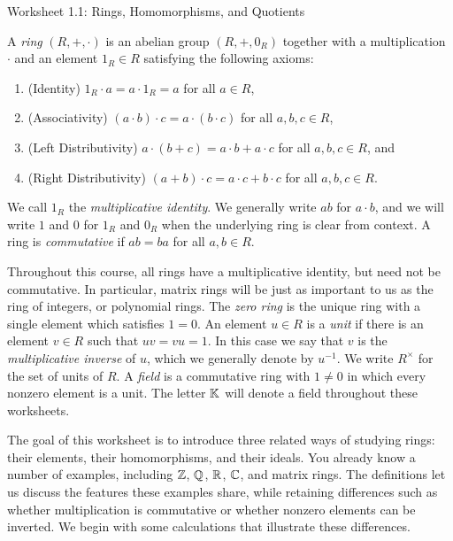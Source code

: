 \documentclass[Notebook.tex]{subfiles}
\begin{document}
\ifSubfilesClassLoaded{
    
}{}

\begin{center}
	{Worksheet 1.1: Rings, Homomorphisms, and Quotients}
\end{center}

A \emph{ring} $(R,+,\cdot)$ is an abelian group $(R,+,0_R)$ together with a multiplication $\cdot$ and an element $1_R\in R$ satisfying the following axioms:
\begin{enumerate}[label=(\roman*)]
	\item (Identity) $1_R\cdot a=a \cdot 1_R=a$ for all $a\in R$,
	\item (Associativity) $(a\cdot b)\cdot c=a\cdot(b\cdot c)$ for all $a,b,c\in R$,
	\item (Left Distributivity) $a\cdot(b+c)=a\cdot b+a \cdot c$ for all $a,b,c\in R$, and
	\item (Right Distributivity) $(a+b)\cdot c=a\cdot c+b \cdot c$ for all $a,b,c\in R$.
\end{enumerate}
We call $1_{R}$ the \emph{multiplicative identity}. We generally write $ab$ for $a\cdot b$, and we will write $1$ and $0$ for $1_R$ and $0_R$ when the underlying ring is clear from context. A ring is \emph{commutative} if $ab=ba$ for all $a,b\in R$.

Throughout this course, all rings have a multiplicative identity, but need not be commutative. In particular, matrix rings will be just as important to us as the ring of integers, or polynomial rings. The \emph{zero ring} is the unique ring with a single element which satisfies $1=0$. An element $u\in R$ is a \emph{unit} if there is an element $v\in R$ such that $uv=vu=1$. In this case we say that $v$ is the \emph{multiplicative inverse} of $u$, which we generally denote by $u^{-1}$. We write $R^\times$ for the set of units of $R$. A \emph{field} is a commutative ring with $1\ne0$ in which every nonzero element is a unit. The letter $\mathbb K$ will denote a field throughout these worksheets.

The goal of this worksheet is to introduce three related ways of studying rings: their elements, their homomorphisms, and their ideals. You already know a number of examples, including $\mathbb Z$, $\mathbb Q$, $\mathbb R$, $\mathbb C$, and matrix rings. The definitions let us discuss the features these examples share, while retaining differences such as whether multiplication is commutative or whether nonzero elements can be inverted. We begin with some calculations that illustrate these differences.
\end{document}

